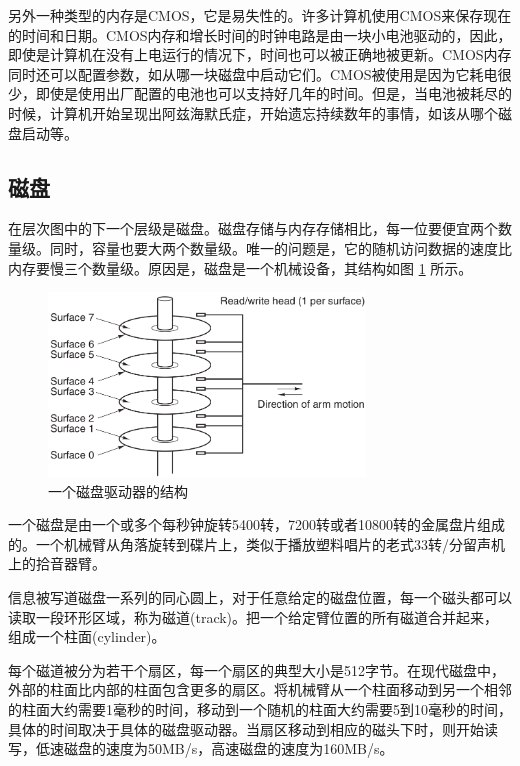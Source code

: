	另外一种类型的内存是CMOS，它是易失性的。许多计算机使用CMOS来保存现在的时间和日期。CMOS内存和增长时间的时钟电路是由一块小电池驱动的，因此，即使是计算机在没有上电运行的情况下，时间也可以被正确地被更新。CMOS内存同时还可以配置参数，如从哪一块磁盘中启动它们。CMOS被使用是因为它耗电很少，即使是使用出厂配置的电池也可以支持好几年的时间。但是，当电池被耗尽的时候，计算机开始呈现出阿兹海默氏症，开始遗忘持续数年的事情，如该从哪个磁盘启动等。
	
	\subsection{磁盘}
	
	在层次图中的下一个层级是磁盘。磁盘存储与内存存储相比，每一位要便宜两个数量级。同时，容量也要大两个数量级。唯一的问题是，它的随机访问数据的速度比内存要慢三个数量级。原因是，磁盘是一个机械设备，其结构如图 \ref{fig:disk} 所示。
	
	\begin{figure}[ht]\small
		\centering
		\includegraphics[width=0.75\textwidth]{FIG/1-10.png}
		\caption{一个磁盘驱动器的结构}\label{fig:disk}
	\end{figure}

	一个磁盘是由一个或多个每秒钟旋转5400转，7200转或者10800转的金属盘片组成的。一个机械臂从角落旋转到碟片上，类似于播放塑料唱片的老式33转/分留声机上的拾音器臂。
	
	信息被写道磁盘一系列的同心圆上，对于任意给定的磁盘位置，每一个磁头都可以读取一段环形区域，称为磁道(track)。把一个给定臂位置的所有磁道合并起来，组成一个柱面(cylinder)。
	
	每个磁道被分为若干个扇区，每一个扇区的典型大小是512字节。在现代磁盘中，外部的柱面比内部的柱面包含更多的扇区。将机械臂从一个柱面移动到另一个相邻的柱面大约需要1毫秒的时间，移动到一个随机的柱面大约需要5到10毫秒的时间，具体的时间取决于具体的磁盘驱动器。当扇区移动到相应的磁头下时，则开始读写，低速磁盘的速度为50MB/s，高速磁盘的速度为160MB/s。
	
